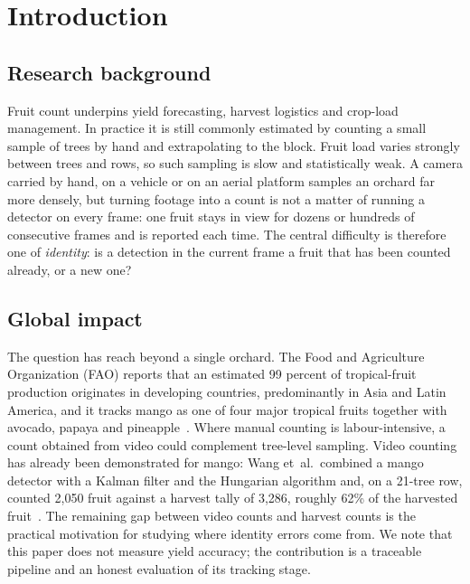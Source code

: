 \documentclass[11pt,a4paper]{article}
\begin{document}
\section{Introduction}\label{sec:intro}

\subsection{Research background}
Fruit count underpins yield forecasting, harvest logistics and crop-load management. In practice it is still commonly estimated by counting a small sample of trees by hand and extrapolating to the block. Fruit load varies strongly between trees and rows, so such sampling is slow and statistically weak. A camera carried by hand, on a vehicle or on an aerial platform samples an orchard far more densely, but turning footage into a count is not a matter of running a detector on every frame: one fruit stays in view for dozens or hundreds of consecutive frames and is reported each time. The central difficulty is therefore one of \emph{identity}: is a detection in the current frame a fruit that has been counted already, or a new one?

\subsection{Global impact}
The question has reach beyond a single orchard. The Food and Agriculture Organization (FAO) reports that an estimated 99 percent of tropical-fruit production originates in developing countries, predominantly in Asia and Latin America, and it tracks mango as one of four major tropical fruits together with avocado, papaya and pineapple~\cite{fao_tropical}. Where manual counting is labour-intensive, a count obtained from video could complement tree-level sampling. Video counting has already been demonstrated for mango: Wang et~al.\ combined a mango detector with a Kalman filter and the Hungarian algorithm and, on a 21-tree row, counted 2{,}050 fruit against a harvest tally of 3{,}286, roughly 62\% of the harvested fruit~\cite{wang2019mango}. The remaining gap between video counts and harvest counts is the practical motivation for studying where identity errors come from. We note that this paper does not measure yield accuracy; the contribution is a traceable pipeline and an honest evaluation of its tracking stage.
\end{document}
